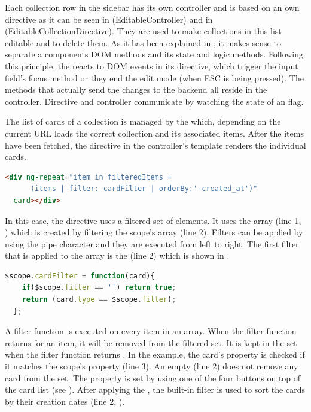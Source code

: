 Each collection row in the sidebar has its own controller and is based on an own directive as it can be seen in  (EditableController) and in  (EditableCollectionDirective). They are used to make collections in this list editable and to delete them. As it has been explained in , it makes sense to separate a components DOM methods and its state and logic methods. Following this principle, the  reacts to DOM events in its directive, which trigger the input field's focus method or they end the edit mode (when ESC is being pressed). The methods that actually send the changes to the backend all reside in the controller. Directive and controller communicate by watching the state of an  flag.

The list of cards of a collection is managed by the  which, depending on the current URL loads the correct collection and its associated items. After the items have been fetched, the  directive in the controller's template renders the individual cards.

\begin{lstlisting}[language=HTML, caption=CardListController template, label=lst:cardlist-template]
  <div ng-repeat="item in filteredItems = 
      (items | filter: cardFilter | orderBy:'-created_at')"
  card></div>
\end{lstlisting}

In this case, the  directive uses a filtered set of elements. It uses the  array (line 1, ) which is created by filtering the scope's  array (line 2). Filters can be applied by using the pipe character and they are executed from left to right. The first filter that is applied to the  array is the  (line 2) which is shown in .

\begin{lstlisting}[language=JavaScript, caption=CardListController filter, label=lst:cardlist-filter]
  $scope.cardFilter = function(card){
    if($scope.filter == '') return true;
    return (card.type == $scope.filter);
  };
\end{lstlisting}

A filter function is executed on every item in an array. When the filter function returns  for an item, it will be removed from the filtered set. It is kept in the set when the filter function returns . In the  example, the card's  property is checked if it matches the scope's  property (line 3). An empty  (line 2) does not remove any card from the set. The  property is set by using one of the four buttons on top of the card list (see ). After applying the , the built-in  filter is used to sort the cards by their creation dates (line 2, ).

